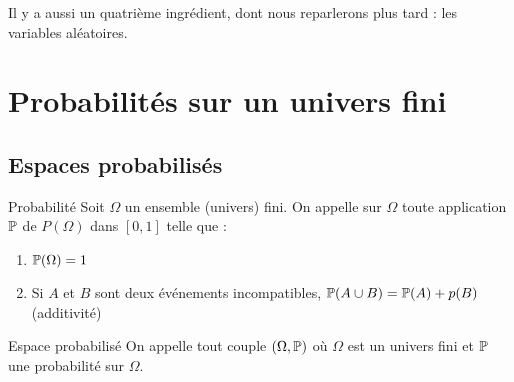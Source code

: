 \documentclass[12pt,a4paper]{report}
\begin{document}
Il y a aussi un quatrième ingrédient, dont nous reparlerons plus tard : les variables aléatoires.

\newpage

\section{Probabilités sur un univers fini}

\subsection{Espaces probabilisés}

\begin{definition}{Probabilité}{}
Soit $\Omega$ un ensemble (univers) fini. On appelle  sur $\Omega$ toute application $\mathbb{P}$ de $P(\Omega)$ dans $[0,1]$ telle que :
\begin{enumerate}
\item $\mathbb{P}(\Omega) = 1$
\item Si $A$ et $B$ sont deux événements incompatibles, $\mathbb{P}(A \cup B) = \mathbb{P}(A) + p(B)$ (additivité)
\end{enumerate}
\end{definition}

\begin{definition}{Espace probabilisé}{}
On appelle  tout couple $(\Omega,\mathbb{P})$ où $\Omega$ est un univers fini et $\mathbb{P}$ une probabilité sur $\Omega$.
\end{definition}
\end{document}
